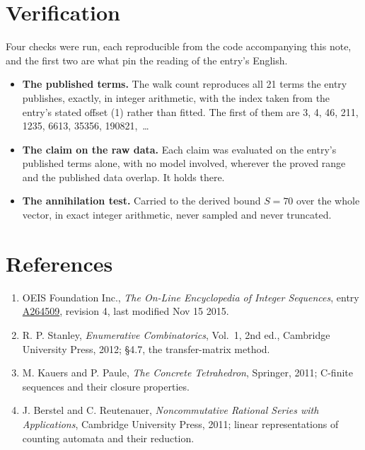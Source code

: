 \documentclass[11pt]{article}
\theoremstyle{definition}
\begin{document}
\section{Verification}

Four checks were run, each reproducible from the code accompanying this note, and the first two are what pin the reading of the entry's English.

\begin{itemize}

\item {\bfseries The published terms.} The walk count reproduces all 21 terms the entry publishes, exactly, in integer arithmetic, with the index taken from the entry's stated offset (1) rather than fitted. The first of them are 3, 4, 46, 211, 1235, 6613, 35356, 190821,~\dots

\item {\bfseries The claim on the raw data.} Each claim was evaluated on the entry's published terms alone, with no model involved, wherever the proved range and the published data overlap. It holds there.

\item {\bfseries The annihilation test.} Carried to the derived bound $S = 70$ over the whole vector, in exact integer arithmetic, never sampled and never truncated.

\end{itemize}

\section{References}

\begin{enumerate}

\item OEIS Foundation Inc., \emph{The On-Line Encyclopedia of Integer Sequences}, entry \href{https://oeis.org/A264509}{A264509}, revision 4, last modified Nov 15 2015.

\item R. P. Stanley, \emph{Enumerative Combinatorics}, Vol.~1, 2nd ed., Cambridge University Press, 2012; \S4.7, the transfer-matrix method.

\item M. Kauers and P. Paule, \emph{The Concrete Tetrahedron}, Springer, 2011; C-finite sequences and their closure properties.

\item J. Berstel and C. Reutenauer, \emph{Noncommutative Rational Series with Applications}, Cambridge University Press, 2011; linear representations of counting automata and their reduction.

\end{enumerate}
\end{document}
